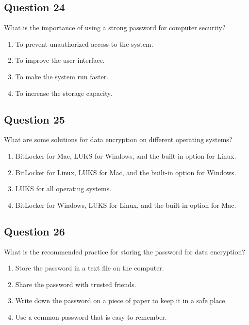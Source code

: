 \documentclass[12pt,a4paper]{article}
\begin{document}
\bigskip


\subsection*{Question 24}
What is the importance of using a strong password for computer security?

\begin{enumerate}[label=\Alph*., leftmargin=*]
\item To prevent unauthorized access to the system.
\item To improve the user interface.
\item To make the system run faster.
\item To increase the storage capacity.
\end{enumerate}

\bigskip


\subsection*{Question 25}
What are some solutions for data encryption on different operating systems?

\begin{enumerate}[label=\Alph*., leftmargin=*]
\item BitLocker for Mac, LUKS for Windows, and the built-in option for Linux.
\item BitLocker for Linux, LUKS for Mac, and the built-in option for Windows.
\item LUKS for all operating systems.
\item BitLocker for Windows, LUKS for Linux, and the built-in option for Mac.
\end{enumerate}

\bigskip


\subsection*{Question 26}
What is the recommended practice for storing the password for data encryption?

\begin{enumerate}[label=\Alph*., leftmargin=*]
\item Store the password in a text file on the computer.
\item Share the password with trusted friends.
\item Write down the password on a piece of paper to keep it in a safe place.
\item Use a common password that is easy to remember.
\end{enumerate}
\end{document}
